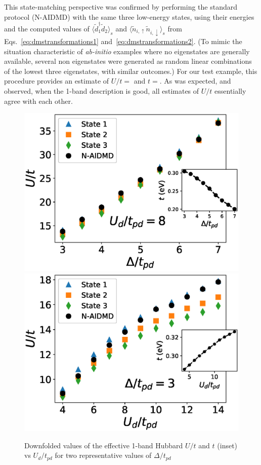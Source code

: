 This state-matching perspective was confirmed by performing the standard protocol (N-AIDMD) with the same three low-energy states, 
using their energies and the computed values of $\langle \tilde{d}_1^{\dagger} \tilde{d}_2 \rangle_s$ 
and $\langle \tilde{n}_{i,\uparrow} \tilde{n}_{i,\downarrow} \rangle_{s}$ from Eqs.~\eqref{eq:dmstransformations1} 
and~\eqref{eq:dmstransformations2}. 
(To mimic the situation characteristic of \textit{ab-initio} examples where no eigenstates are generally available, 
several non eigenstates were generated as random linear combinations of the lowest three eigenstates, with 
similar outcomes.) For our test example, this procedure provides an estimate of $U/t = $ and $t = $. 
As was expected, and observed, when the 1-band description is good, all estimates of $U/t$ 
essentially agree with each other. 

\begin{figure}[]
\centering
\includegraphics[width=0.49\linewidth]{./Figures/U_and_hopping_combined_vs_ep_Ud_8.eps}
\includegraphics[width=0.48\linewidth]{./Figures/U_and_hopping_combined_vs_Ud_ep_3.eps}
\caption{Downfolded values of the effective 1-band Hubbard $U/t$ and $t$ (inset) 
vs $U_d/t_{pd}$ for two representative values of $\Delta/t_{pd}$}
\label{fig:varyUdep} 
\end{figure}	
 
